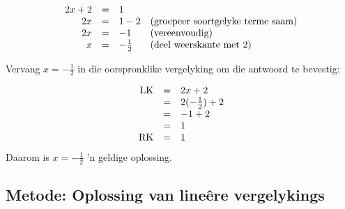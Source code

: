 % 
% 
\begin{equation*}
  \begin{array}{ccll}\hfill 2x+2& =& 1\hfill \\ 
      \hfill 2x& =& 1-2\hfill & \mbox{(groepeer soortgelyke terme saam)}\hfill \\ 
      \hfill 2x& =& -1\hfill & \mbox{(vereenvoudig)}\hfill \\
\hfill x&=& -\frac{1}{2} & \mbox{(deel weerskante met $2$)} \hfill
  \end{array}
\end{equation*}

\begin{equation*}

\end{equation*}
Vervang  $x=-\frac{1}{2}$ in die oorspronklike vergelyking om die antwoord te bevestig:

\begin{equation*}
    \begin{array}{ccl}\hfill \mbox{LK}& =& 2x+2\hfill \\
	  & =& 2(-\frac{1}{2})+2\hfill \\
	  & =& -1+2\hfill \\
	  & =& 1\hfill \\
	  \hfill \mbox{RK}& =& 1\hfill \\
    \end{array}
\end{equation*}
Daarom is $x = -\frac{1}{2}$ 'n geldige oplossing.


\subsection*{Metode: Oplossing van lineêre vergelykings}

